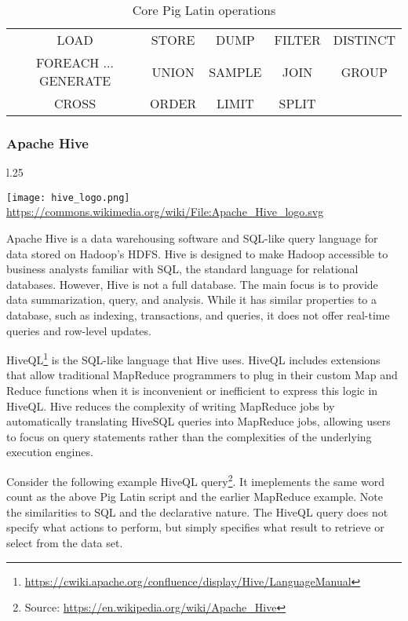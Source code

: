 \begin{table}
\centering

\renewcommand{\arraystretch}{1.5}
\begin{tabular}{ccccc} 
LOAD & STORE & DUMP & FILTER & DISTINCT \\
FOREACH $\ldots$ GENERATE & UNION & SAMPLE & JOIN & GROUP \\
CROSS & ORDER & LIMIT & SPLIT \\
\end{tabular}
\caption{Core Pig Latin operations}
\label{tab:pigoperators}
\end{table}


\subsubsection*{Apache Hive}

\begin{wrapfigure}{l}{.25\textwidth}
\begin{center}
\texttt{[image: hive\_logo.png]} \\
\tiny\url{https://commons.wikimedia.org/wiki/File:Apache_Hive_logo.svg}
\end{center}
\end{wrapfigure}
Apache Hive is a data warehousing software and SQL-like query language for data stored on Hadoop's HDFS. Hive is designed to make Hadoop accessible to business analysts familiar with SQL, the standard language for relational databases. However, Hive is not a full database. The main focus is to provide data summarization, query, and analysis. While it has similar properties to a database, such as indexing, transactions, and queries, it does not offer real-time queries and row-level updates.

HiveQL\footnote{\url{https://cwiki.apache.org/confluence/display/Hive/LanguageManual}} is the SQL-like language that Hive uses. HiveQL includes extensions that allow traditional MapReduce programmers to plug in their custom Map and Reduce functions when it is inconvenient or inefficient to express this logic in HiveQL. Hive reduces the complexity of writing MapReduce jobs by automatically translating HiveSQL queries into MapReduce jobs, allowing users to focus on query statements rather than the complexities of the underlying execution engines.

Consider the following example HiveQL query\footnote{\small Source: \url{https://en.wikipedia.org/wiki/Apache_Hive}}. It imeplements the same word count as the above Pig Latin script and the earlier MapReduce example. Note the similarities to SQL and the declarative nature. The HiveQL query does not specify what actions to perform, but simply specifies what result to retrieve or select from the data set. 

